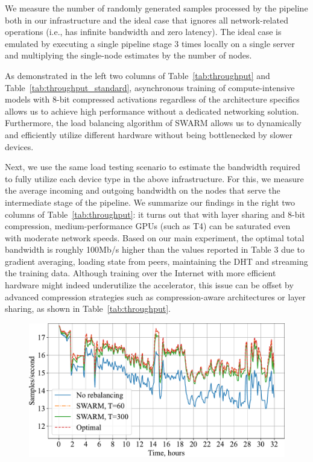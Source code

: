 We measure the number of randomly generated samples processed by the pipeline both in our infrastructure and the ideal case that ignores all network-related operations (i.e., has infinite bandwidth and zero latency). The ideal case is emulated by executing a single pipeline stage 3 times locally on a single server and multiplying the single-node estimates by the number of nodes.

As demonstrated in the left two columns of Table~\ref{tab:throughput} and Table~\ref{tab:throughput_standard}, asynchronous training of compute-intensive models with 8-bit compressed activations regardless of the architecture specifics allows us to achieve high performance without a dedicated networking solution. Furthermore, the load balancing algorithm of SWARM allows us to dynamically and efficiently utilize different hardware without being bottlenecked by slower devices. 


Next, we use the same load testing scenario to estimate the bandwidth required to fully utilize each device type in the above infrastructure. For this, we measure the average incoming and outgoing bandwidth on the nodes that serve the intermediate stage of the pipeline. We summarize our findings in the right two columns of Table~\ref{tab:throughput}: it turns out that with layer sharing and 8-bit compression, medium-performance GPUs (such as T4) can be saturated even with moderate network speeds. Based on our main experiment, the optimal total bandwidth is roughly 100Mb/s higher than the values reported in Table 3 due to gradient averaging, loading state from peers, maintaining the DHT and streaming the training data.
Although training over the Internet with more efficient hardware might indeed underutilize the accelerator, this issue can be offset by advanced compression strategies such as compression-aware architectures or layer sharing, as shown in Table~\ref{tab:throughput}.

\begin{figure}[t]
    \centering
    \includegraphics[width=\linewidth]{resources/rebalancing_activity.pdf}
    \label{fig:rebalancing}
\end{figure}


